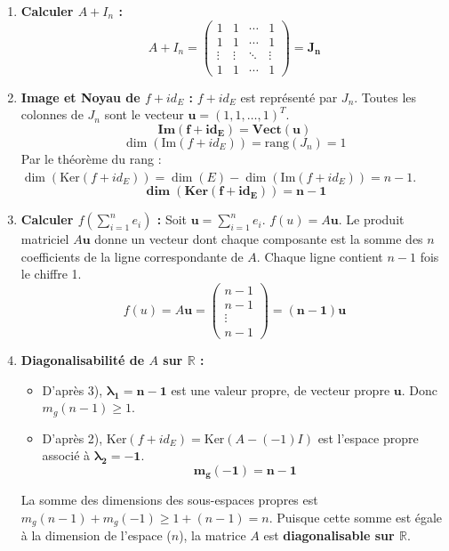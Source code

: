 \documentclass[french]{yLectureNote}
\begin{document}
\begin{enumerate}
    \item \textbf{Calculer $A+I_{n}$ :}
    $$A+I_n = \begin{pmatrix} 1 & 1 & \cdots & 1 \\ 1 & 1 & \cdots & 1 \\ \vdots & \vdots & \ddots & \vdots \\ 1 & 1 & \cdots & 1 \end{pmatrix} = \mathbf{J_n}$$

    \item \textbf{Image et Noyau de $f+id_{E}$ :}
    $f+id_E$ est représenté par $J_n$. Toutes les colonnes de $J_n$ sont le vecteur $\mathbf{u} = (1, 1, \ldots, 1)^T$.
    $$\mathbf{Im(f+id_{E}) = \text{Vect}(\mathbf{u})}$$
    $$\dim(\text{Im}(f+id_{E})) = \text{rang}(J_n) = 1$$
    Par le théorème du rang : $\dim(\text{Ker}(f+id_{E})) = \dim(E) - \dim(\text{Im}(f+id_{E})) = n - 1$.
    $$\mathbf{\dim(\text{Ker}(f+id_{E})) = n-1}$$

    \item \textbf{Calculer $f(\sum_{i=1}^{n}e_{i})$ :}
    Soit $\mathbf{u} = \sum_{i=1}^{n}e_{i}$. $f(u) = A\mathbf{u}$.
    Le produit matriciel $A\mathbf{u}$ donne un vecteur dont chaque composante est la somme des $n$ coefficients de la ligne correspondante de $A$. Chaque ligne contient $n-1$ fois le chiffre 1.
    $$f(u) = A\mathbf{u} = \begin{pmatrix} n-1 \\ n-1 \\ \vdots \\ n-1 \end{pmatrix} = \mathbf{(n-1)\mathbf{u}}$$

    \item \textbf{Diagonalisabilité de $A$ sur $\mathbb{R}$ :}
    \begin{itemize}
        \item D'après 3), $\mathbf{\lambda_1 = n-1}$ est une valeur propre, de vecteur propre $\mathbf{u}$. Donc $m_g(n-1) \ge 1$.
        \item D'après 2), $\text{Ker}(f+id_E) = \text{Ker}(A - (-1)I)$ est l'espace propre associé à $\mathbf{\lambda_2 = -1}$.
        $$\mathbf{m_g(-1) = n-1}$$
    \end{itemize}
    La somme des dimensions des sous-espaces propres est $m_g(n-1) + m_g(-1) \ge 1 + (n-1) = n$.
    Puisque cette somme est égale à la dimension de l'espace ($n$), la matrice $A$ est \textbf{diagonalisable sur $\mathbb{R}$}.


\end{enumerate}
\end{document}
